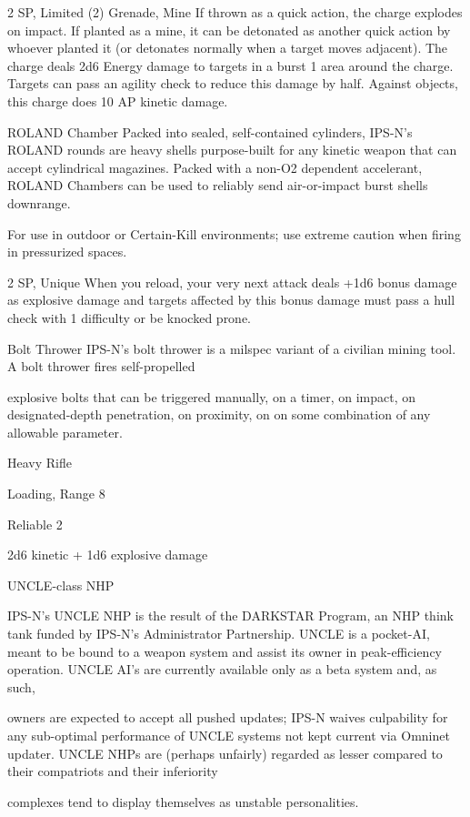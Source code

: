 2 SP, Limited (2)
Grenade, Mine
If thrown as a quick action, the charge explodes on impact. If planted as a mine, it can be
detonated as another quick action by whoever planted it (or detonates normally when a target
moves adjacent). The charge deals 2d6 Energy damage to targets in a burst 1 area around the
charge. Targets can pass an agility check to reduce this damage by half. Against objects, this
charge does 10 AP kinetic damage.

ROLAND Chamber
Packed into sealed, self-contained cylinders, IPS-N’s ROLAND rounds are heavy shells purpose-built for
any kinetic weapon that can accept cylindrical magazines. Packed with a non-O2 dependent accelerant,
ROLAND Chambers can be used to reliably send air-or-impact burst shells downrange.

For use in outdoor or Certain-Kill environments; use extreme caution when firing in pressurized spaces.

2 SP, Unique
When you reload, your very next attack deals +1d6 bonus damage as explosive damage and
targets affected by this bonus damage must pass a hull check with 1 difficulty or be knocked
prone.


Bolt Thrower
IPS-N’s bolt thrower is a milspec variant of a civilian mining tool. A bolt thrower fires self-propelled

explosive bolts that can be triggered manually, on a timer, on impact, on designated-depth penetration, on
proximity, on on some combination of any allowable parameter.

Heavy Rifle

Loading, Range 8

Reliable 2

2d6 kinetic + 1d6 explosive damage


UNCLE-class NHP




IPS-N’s UNCLE NHP is the result of the DARKSTAR Program, an NHP think tank funded by IPS-N’s
Administrator Partnership. UNCLE is a pocket-AI, meant to be bound to a weapon system and assist its
owner in peak-efficiency operation. UNCLE AI’s are currently available only as a beta system and, as such,

owners are expected to accept all pushed updates; IPS-N waives culpability for any sub-optimal
performance of UNCLE systems not kept current via Omninet updater.
UNCLE NHPs are (perhaps unfairly) regarded as lesser compared to their compatriots and their inferiority

complexes tend to display themselves as unstable personalities.

